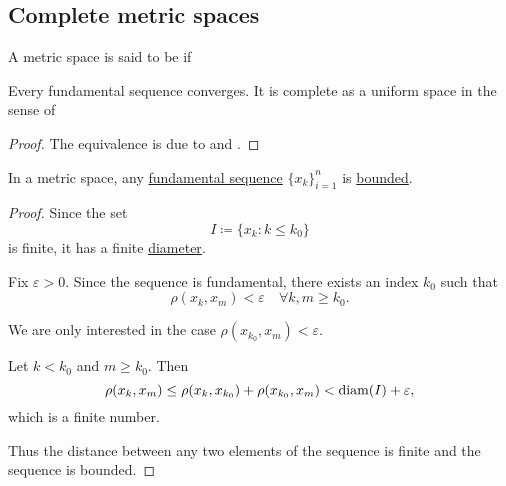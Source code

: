 \subsection{Complete metric spaces}\label{subsec:metric_convergence}

\begin{definition}\label{def:complete_metric_space}
  A metric space is said to be  if
  \begin{DefEnum}
     Every fundamental sequence converges.
     It is complete as a uniform space in the sense of 
  \end{DefEnum}
\end{definition}
\begin{proof}
  The equivalence is due to  and .
\end{proof}

\begin{proposition}\label{thm:fundamental_sequence_is_bounded}
  In a metric space, any \hyperref[def:fundamental_net]{fundamental sequence} \( \{ x_k \}_{i=1}^n \) is \hyperref[def:metric_space/bounded_sequence]{bounded}.
\end{proposition}
\begin{proof}
  Since the set
  \begin{equation*}
    I \coloneqq \{ x_k \colon k \leq k_0 \}
  \end{equation*}
  is finite, it has a finite \hyperref[def:metric_space/diameter]{diameter}.

  Fix \( \varepsilon > 0 \). Since the sequence is fundamental, there exists an index \( k_0 \) such that
  \begin{equation*}
    \rho(x_k, x_m) < \varepsilon \quad\forall k, m \geq k_0.
  \end{equation*}

  We are only interested in the case \( \rho(x_{k_0}, x_m) < \varepsilon \).

  Let \( k < k_0 \) and \( m \geq k_0 \). Then
  \begin{equation*}
    \rho(x_k, x_m) \leq \rho(x_k, x_{k_0}) + \rho(x_{k_0}, x_m) < \operatorname{diam}(I) + \varepsilon,
  \end{equation*}
  which is a finite number.

  Thus the distance between any two elements of the sequence is finite and the sequence is bounded.
\end{proof}

